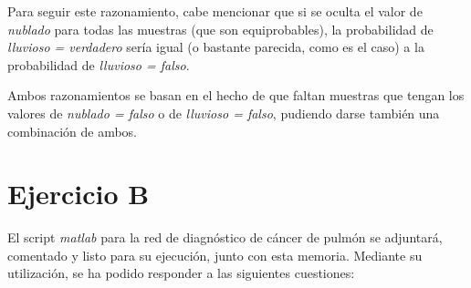 \documentclass[a4paper]{article}
\begin{document}
\quad Para seguir este razonamiento, cabe mencionar que si se oculta el valor de \textit{nublado} para todas las muestras (que son equiprobables), la probabilidad de \textit{lluvioso = verdadero} sería igual (o bastante parecida, como es el caso) a la probabilidad de \textit{lluvioso = falso}.

\quad Ambos razonamientos se basan en el hecho de que faltan muestras que tengan los valores de \textit{nublado = falso} o de \textit{lluvioso = falso}, pudiendo darse también una combinación de ambos.
\newpage
\section{Ejercicio B}
\quad El script \textit{matlab} para la red de diagnóstico de cáncer de pulmón se adjuntará, comentado y listo para su ejecución, junto con esta memoria. Mediante su utilización, se ha podido responder a las siguientes cuestiones:
\end{document}
